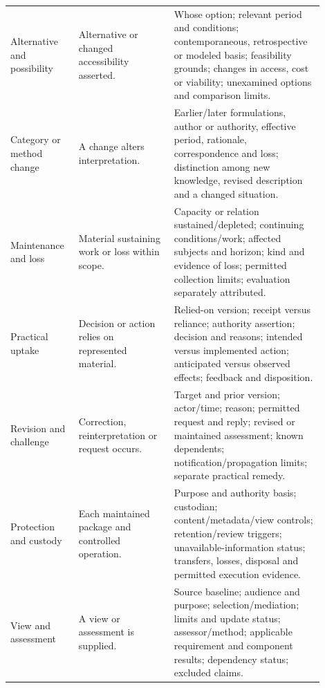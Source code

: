 \documentclass[11pt,a4paper]{article}
\begin{document}
\begin{longtable}{@{}L{0.18\linewidth}L{0.28\linewidth}L{0.44\linewidth}@{}}
Alternative and possibility & Alternative or changed accessibility asserted. & Whose option; relevant period and conditions; contemporaneous, retrospective or modeled basis; feasibility grounds; changes in access, cost or viability; unexamined options and comparison limits.\\
Category or method change & A change alters interpretation. & Earlier/later formulations, author or authority, effective period, rationale, correspondence and loss; distinction among new knowledge, revised description and a changed situation.\\
Maintenance and loss & Material sustaining work or loss within scope. & Capacity or relation sustained/depleted; continuing conditions/work; affected subjects and horizon; kind and evidence of loss; permitted collection limits; evaluation separately attributed.\\
Practical uptake & Decision or action relies on represented material. & Relied-on version; receipt versus reliance; authority assertion; decision and reasons; intended versus implemented action; anticipated versus observed effects; feedback and disposition.\\
Revision and challenge & Correction, reinterpretation or request occurs. & Target and prior version; actor/time; reason; permitted request and reply; revised or maintained assessment; known dependents; notification/propagation limits; separate practical remedy.\\
Protection and custody & Each maintained package and controlled operation. & Purpose and authority basis; custodian; content/metadata/view controls; retention/review triggers; unavailable-information status; transfers, losses, disposal and permitted execution evidence.\\
View and assessment & A view or assessment is supplied. & Source baseline; audience and purpose; selection/mediation; limits and update status; assessor/method; applicable requirement and component results; dependency status; excluded claims.\\
\bottomrule
\end{longtable}
\end{document}
